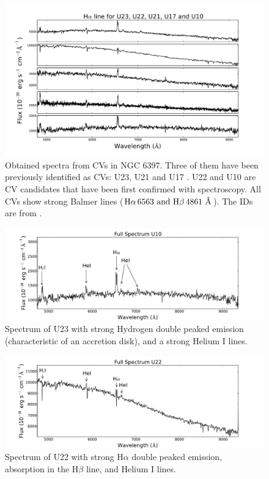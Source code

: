 \begin{figure}[]
        \centering
        \includegraphics[scale=.6]{assets/images/todostodos.pdf}
\caption{Obtained spectra from CVs in NGC 6397. Three of them have been previously identified as CVs: U23, U21 and U17 \citep{grindlay_spectroscopic_1995,edmonds_cataclysmic_1999}. U22 and  U10 are CV candidates that have been first confirmed with spectroscopy. All CVs show strong Balmer lines ($ \text H \alpha \, 6563 \text{ and H}\beta \,  4861 \text{ \r A}$). The IDs are from \citep{bogdanov_chandra_2010}.}
\label{fig:todosspectra}
\end{figure}

\begin{figure}[]
        \centering
        \includegraphics[scale=.5]{assets/images/U10full.pdf}
\caption{Spectrum of U23 with strong Hydrogen double peaked emission (characteristic of an accretion disk), and a strong Helium I lines. }
\label{fig:U10spectra}
\end{figure}

\begin{figure}[]
        \centering
        \includegraphics[scale=.5]{assets/images/U22full.pdf}
\caption{Spectrum of U22 with strong H$\alpha$ double peaked emission, absorption in the H$\beta$ line, and Helium I lines.}
\label{fig:U22spectra}
\end{figure}


